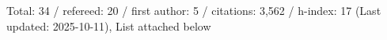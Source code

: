 Total: 34 / refereed: 20 / first author: 5 / citations: 3,562 / h-index: 17 (Last updated: 2025-10-11), List attached below